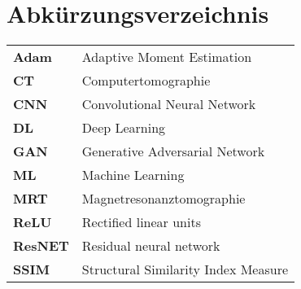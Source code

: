 
\chapter*{Abkürzungsverzeichnis}
\begin{longtable}{ll}
\textbf{Adam} & Adaptive Moment Estimation \\
\textbf{CT} & Computertomographie \\
\textbf{CNN} & Convolutional Neural Network \\
\textbf{DL} & Deep Learning \\
\textbf{GAN}  & Generative Adversarial Network \\ 
\textbf{ML} & Machine Learning\\
\textbf{MRT} & Magnetresonanztomographie \\
\textbf{ReLU} & Rectified linear units\\
\textbf{ResNET} & Residual neural network\\
\textbf{SSIM} & Structural Similarity Index Measure\\
\end{longtable}

\cleardoublepage
